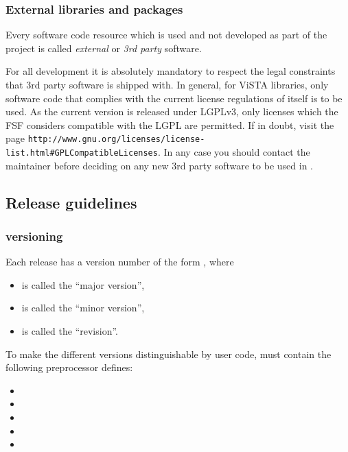\subsubsection{External libraries and packages}
Every software code resource which is used and not developed as part of the  project is called \emph{external} or \emph{3rd party} software.

For all  development it is absolutely mandatory to respect the legal constraints that 3rd party software is shipped with.
In general, for ViSTA libraries, only software code that complies with the current license regulations of  itself is to be used.
As the current  version is released under LGPLv3, only licenses which the FSF considers compatible with the LGPL are permitted.
If in doubt, visit the page \texttt{http://www.gnu.org/licenses/license-list.html\#GPLCompatibleLicenses}. 
In any case you should contact the  maintainer before deciding on any new 3rd party software to be used in .

\subsection{Release guidelines}

\subsubsection{ versioning}
Each  release has a version number of the form , where
\begin{itemize}
\item{} is called the ``major version'',
\item{} is called the ``minor version'',
\item{} is called the ``revision''.
\end{itemize}

To make the different versions distinguishable by user code,  must contain the following preprocessor defines:
\begin{itemize}
\item{}
\item{}
\item{}
\item{}
\item{}
\end{itemize}



